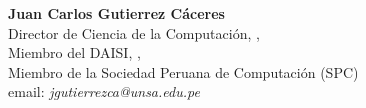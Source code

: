 \begin{center}
\textbf{Juan Carlos Gutierrez Cáceres}\\
Director de Ciencia de la Computación, \University, \city\\
Miembro del DAISI, \University, \city\\
Miembro de la Sociedad Peruana de Computación (SPC)\\
email: \textit{jgutierrezca@unsa.edu.pe}
\end{center}
